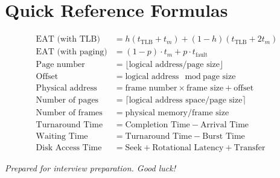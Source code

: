 \documentclass[12pt,a4paper]{article}
\begin{document}
\section*{Quick Reference Formulas}

\begin{tcolorbox}[colback=lightyellow, colframe=orange, title=\textbf{Important Formulas}]
\begin{align*}
\text{EAT (with TLB)} &= h(t_{\text{TLB}} + t_m) + (1-h)(t_{\text{TLB}} + 2t_m) \\[6pt]
\text{EAT (with paging)} &= (1-p) \cdot t_m + p \cdot t_{\text{fault}} \\[6pt]
\text{Page number} &= \lfloor \text{logical address} / \text{page size} \rfloor \\[4pt]
\text{Offset} &= \text{logical address} \mod \text{page size} \\[4pt]
\text{Physical address} &= \text{frame number} \times \text{frame size} + \text{offset} \\[6pt]
\text{Number of pages} &= \lceil \text{logical address space} / \text{page size} \rceil \\[4pt]
\text{Number of frames} &= \text{physical memory} / \text{frame size} \\[6pt]
\text{Turnaround Time} &= \text{Completion Time} - \text{Arrival Time} \\[4pt]
\text{Waiting Time} &= \text{Turnaround Time} - \text{Burst Time} \\[4pt]
\text{Disk Access Time} &= \text{Seek} + \text{Rotational Latency} + \text{Transfer}
\end{align*}
\end{tcolorbox}

\vfill
\begin{center}
\textit{Prepared for interview preparation. Good luck!}
\end{center}
\end{document}

